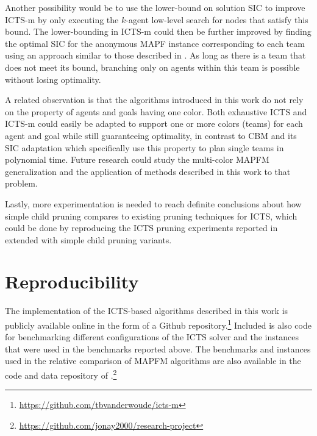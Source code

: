 \documentclass[english]{article}
\begin{document}
	
	
	
	Another possibility would be to use the lower-bound on solution SIC to improve ICTS-m by only executing the $k$-agent low-level search for nodes that satisfy this bound. The lower-bounding in ICTS-m could then be further improved by finding the optimal SIC for the anonymous MAPF instance corresponding to each team using an approach similar to those described in \cite{baauw2021}. As long as there is a team that does not meet its bound, branching only on agents within this team is possible without losing optimality. 
	
	A related observation is that the algorithms introduced in this work do not rely on the property of agents and goals having one color. Both exhaustive ICTS and ICTS-m could easily be adapted to support one or more colors (teams) for each agent and goal while still guaranteeing optimality, in contrast to CBM \cite{ma2016} and its SIC adaptation \cite{baauw2021} which specifically use this property to plan single teams in polynomial time. Future research could study the multi-color MAPFM generalization and the application of methods described in this work to that problem. 
	
	Lastly, more experimentation is needed to reach definite conclusions about how simple child pruning compares to existing pruning techniques for ICTS, which could be done by reproducing the ICTS pruning experiments reported in \cite{sharon2013} extended with simple child pruning variants. 
	
	
	\section{Reproducibility}
	The implementation of the ICTS-based algorithms described in this work is publicly available online in the form of a Github repository.\footnote{\url{https://github.com/tbvanderwoude/icts-m}} Included is also code for benchmarking different configurations of the ICTS solver and the instances that were used in the benchmarks reported above. The benchmarks and instances used in the relative comparison of MAPFM algorithms are also available in the code and data repository of \cite{donszelmann2021}.\footnote{\url{https://github.com/jonay2000/research-project}}
	
\end{document}
